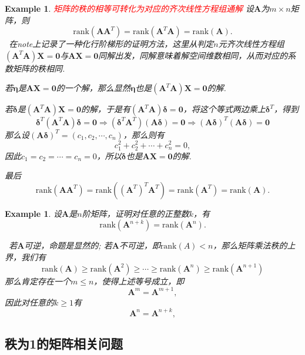 \documentclass{article}
\newtheorem{example}[theorem]{Example}
\newcommand{\hints}{{\color{blue} \text{hints}}}
\newcommand{\mbf}[1]{\bm{#1}}
\newcommand{\rank}[1]{\text{rank}\left(#1\right)} %
\newcommand{\redt}[1]{\textcolor{red}{#1}}
\begin{document}
\begin{example}
\rm \redt{矩阵的秩的相等可转化为对应的齐次线性方程组通解} 设$\mbf{A}$为$m \times n$矩阵，则
$$
\rank{\mbf{A}\mbf{A}^T} = \rank{\mbf{A}^T\mbf{A}} = \rank{\mbf{A}}. 
$$
\hints\ 在note上记录了一种化行阶梯形的证明方法，这里从判定$n$元齐次线性方程组$(\mbf{A}^T\mbf{A})\mbf{X}=\mbf{0}$与$\mbf{A}\mbf{X}= \mbf{0}$同解出发，同解意味着解空间维数相同，从而对应的系数矩阵的秩相同. 

若$\mbf{\eta}$是$\mbf{A}\mbf{X}= \mbf{0}$的一个解，那么显然$\mbf{\eta}$也是$(\mbf{A}^T\mbf{A})\mbf{X}=\mbf{0}$的解. 

若$\mbf{\delta}$是$(\mbf{A}^T\mbf{A})\mbf{X}=\mbf{0}$的解，于是有$(\mbf{A}^T\mbf{A})\mbf{\delta}=\mbf{0}$，将这个等式两边乘上$\mbf{\delta}^T$，得到
$$
\mbf{\delta}^T(\mbf{A}^T\mbf{A})\mbf{\delta}=\mbf{0} \Rightarrow (\mbf{\delta}^T\mbf{A}^T)(\mbf{A}\mbf{\delta})=\mbf{0} \Rightarrow (\mbf{A}\mbf{\delta})^T(\mbf{A}\mbf{\delta})=\mbf{0}
$$
那么设$(\mbf{A}\mbf{\delta})^T = (c_1,c_2,\cdots,c_n)$，那么则有
$$
c_1^2 + c_2^2 + \cdots + c_n^2 = 0,
$$
因此$c_1 = c_2 = \cdots = c_n = 0$，所以$\mbf{\delta}$也是$\mbf{A}\mbf{X}= \mbf{0}$的解. 

最后
$$
\rank{\mbf{A}\mbf{A}^T} = \rank{(\mbf{A}^T)^T\mbf{A}^T} = \rank{\mbf{A}^T} = \rank{\mbf{A}}.   
$$
\end{example}

\begin{example}
\rm 设$\mbf{A}$是$n$阶矩阵，证明对任意的正整数$k$，有
$$
\rank{\mbf{A}^{n+k}} = \rank{\mbf{A}^n}.
$$

\hints\ 若$\mbf{A}$可逆，命题是显然的; 若$\mbf{A}$不可逆，即$\rank{A} < n$，那么矩阵乘法秩的上界，我们有
$$
\rank{\mbf{A}} \geq \rank{\mbf{A}^2} \geq \cdots \geq \rank{\mbf{A}^n} \geq \rank{\mbf{A}^{n+1}}
$$
那么肯定存在一个$m \leq n$，使得上述等号成立，即
$$
\mbf{A}^m = \mbf{A}^{m+1},
$$
因此对任意的$k \geq 1$有
$$
\mbf{A}^n = \mbf{A}^{n+k},
$$
\end{example}

\subsection{秩为1的矩阵相关问题}
\end{document}
